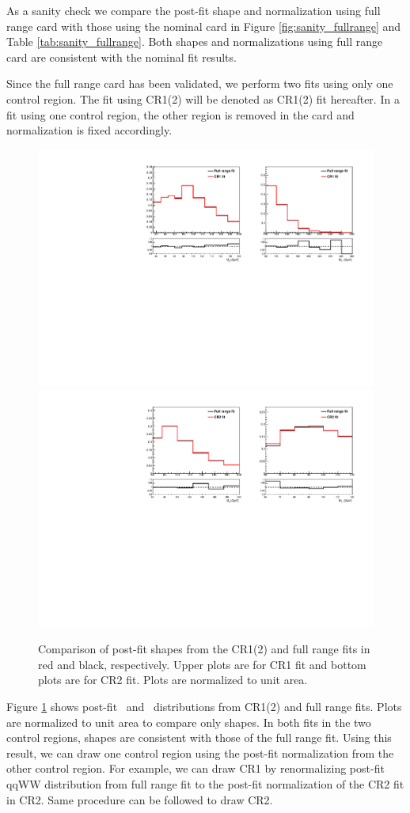 As a sanity check we compare the post-fit shape and normalization 
using full range card with those using the nominal card in Figure \ref{fig:sanity_fullrange} and 
Table \ref{tab:sanity_fullrange}. Both shapes and normalizations using full range card 
are consistent with the nominal fit results. 

Since the full range card has been validated, we perform two fits using only one control region.
The fit using CR1(2) will be denoted as CR1(2) fit hereafter. In a fit using one control region, 
the other region is removed in the card and normalization is fixed accordingly. 
\begin{figure}[!hbtp]
\centering
\includegraphics[width=.8\textwidth]{figures/1Dshape_CR1_plotCR1.pdf} \\
\includegraphics[width=.8\textwidth]{figures/1Dshape_CR2_plotCR2.pdf} 
\caption{Comparison of post-fit shapes from the CR1(2) and full range fits in 
red and black, respectively. Upper plots are for CR1 fit and bottom plots are 
for CR2 fit. Plots are normalized to unit area.}
\label{fig:sanity_fullrangeandcr}
\end{figure}
Figure \ref{fig:sanity_fullrangeandcr} shows post-fit \mt~and \mll~distributions  
from CR1(2) and full range fits. Plots are normalized to unit area to compare only shapes. 
In both fits in the two control regions, shapes are consistent with those of the full range fit.
Using this result, we can draw one control region using the post-fit normalization  
from the other control region. For example, we can draw CR1 by renormalizing
post-fit qqWW distribution from full range fit to the post-fit normalization of the CR2 fit
in CR2. Same procedure can be followed to draw CR2.

